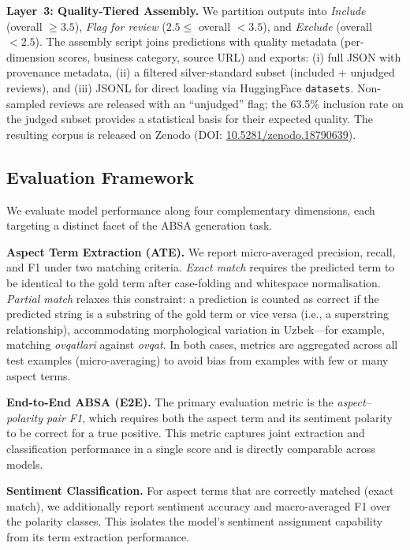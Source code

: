 \documentclass[computers,article,submit,pdftex,moreauthors]{Definitions/mdpi}
\begin{document}
\textbf{Layer~3: Quality-Tiered Assembly.} We partition outputs into \emph{Include} (overall $\geq 3.5$), \emph{Flag for review} ($2.5 \leq$ overall $< 3.5$), and \emph{Exclude} (overall $< 2.5$). The assembly script joins predictions with quality metadata (per-dimension scores, business category, source URL) and exports: (i) full JSON with provenance metadata, (ii) a filtered silver-standard subset (included + unjudged reviews), and (iii) JSONL for direct loading via HuggingFace \texttt{datasets}. Non-sampled reviews are released with an ``unjudged'' flag; the 63.5\% inclusion rate on the judged subset provides a statistical basis for their expected quality. The resulting corpus is released on Zenodo (DOI: \href{https://doi.org/10.5281/zenodo.18790639}{10.5281/zenodo.18790639}).
\subsection{Evaluation Framework}
\label{sec:meth_eval}

We evaluate model performance along four complementary dimensions, each targeting a distinct facet of the ABSA generation task.

\textbf{Aspect Term Extraction (ATE).} We report micro-averaged precision, recall, and F1 under two matching criteria. \emph{Exact match} requires the predicted term to be identical to the gold term after case-folding and whitespace normalisation. \emph{Partial match} relaxes this constraint: a prediction is counted as correct if the predicted string is a substring of the gold term or vice versa (i.e., a superstring relationship), accommodating morphological variation in Uzbek---for example, matching \textit{ovqatlari} against \textit{ovqat}. In both cases, metrics are aggregated across all test examples (micro-averaging) to avoid bias from examples with few or many aspect terms.

\textbf{End-to-End ABSA (E2E).} The primary evaluation metric is the \emph{aspect--polarity pair F1}, which requires both the aspect term and its sentiment polarity to be correct for a true positive. This metric captures joint extraction and classification performance in a single score and is directly comparable across models.

\textbf{Sentiment Classification.} For aspect terms that are correctly matched (exact match), we additionally report sentiment accuracy and macro-averaged F1 over the polarity classes. This isolates the model's sentiment assignment capability from its term extraction performance.
\end{document}
